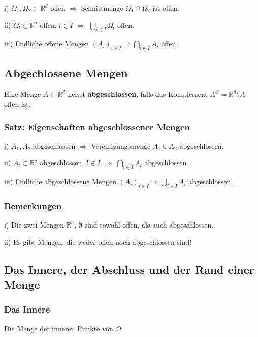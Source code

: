 \documentclass[a4paper, fontsize = 8pt, landscape]{scrartcl}
\newcommand{\R}[0]{\mathbb{R}}
\begin{document}
\begin{multicols*}{3}
    i) $\Omega_1, \Omega_2 \subset \R^d$ offen $\Rightarrow$ Schnittmenge $\Omega_1 \cap \Omega_2$ ist offen. \medskip

    ii) $\Omega_l \subset \R^d$ offen, $l \in I$ $\Rightarrow$ $\bigcup\limits_{i \in I} \Omega_l$ offen.

    iii) Endliche offene Mengen $(A_i)_{i \in I} \Rightarrow \bigcap\limits_{i \in I} A_i$ offen.


    \subsection{Abgechlossene Mengen}

    Eine Menge $A \subset \R^d$ heisst \textbf{abgeschlossen}, falls das Komplement $A^C = \R^d \setminus A$ offen ist.

    \subsubsection{Satz: Eigenschaften abgeschlossener Mengen}

    i) $A_1, A_2$ abgeschlossen $\Rightarrow$ Vereinigungsmenge $A_1 \cup A_2$ abgeschlossen. \medskip

    ii) $A_l \subset \R^d$ abgeschlossen, $l \in I$ $\Rightarrow$ $\bigcap\limits_{i \in I} A_l$ abgeschlossen. \medskip

    iii) Endliche abgeschlossene Mengen $(A_i)_{i \in I} \Rightarrow \bigcup\limits_{i \in I} A_i$ abgeschlossen.


    \subsubsection{Bemerkungen}

    i) Die zwei Mengen $\R^n, \, \emptyset$ sind sowohl offen, als auch abgeschlossen. \medskip

    ii) Es gibt Mengen, die weder offen noch abgeschlossen sind!


    \subsection{Das Innere, der Abschluss und der Rand einer Menge}


    \subsubsection{Das Innere}

    Die Menge der inneren Punkte von $\Omega$


\end{multicols*}
\end{document}
